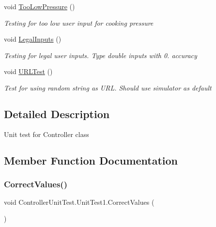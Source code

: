\begin{DoxyCompactItemize}
void \hyperlink{class_controller_unit_test_1_1_unit_test1_a83cb8833e8eba5a8ca87257234602e6e}{Too\+Low\+Pressure} ()
\begin{DoxyCompactList}\small\item\em Testing for too low user input for cooking pressure \end{DoxyCompactList}\item 
void \hyperlink{class_controller_unit_test_1_1_unit_test1_a6b88d429df0c18261c8487cd785230b5}{Legal\+Inputs} ()
\begin{DoxyCompactList}\small\item\em Testing for legal user inputs. Type double inputs with 0. accuracy \end{DoxyCompactList}\item 
void \hyperlink{class_controller_unit_test_1_1_unit_test1_abc3e4821a5f8e5b0555298e835fec144}{U\+R\+L\+Test} ()
\begin{DoxyCompactList}\small\item\em Test for using random string as U\+RL. Should use simulator as default \end{DoxyCompactList}\end{DoxyCompactItemize}


\subsection{Detailed Description}
Unit test for Controller class 



\subsection{Member Function Documentation}
\mbox{\label{class_controller_unit_test_1_1_unit_test1_ab5f5063ecc6c61fcddd18f3ef6694868}} 
\subsubsection{\texorpdfstring{Correct\+Values()}{CorrectValues()}}
{\footnotesize\ttfamily void Controller\+Unit\+Test.\+Unit\+Test1.\+Correct\+Values (\begin{DoxyParamCaption}{ }\end{DoxyParamCaption})\hspace{0.3cm}{\ttfamily [inline]}}



